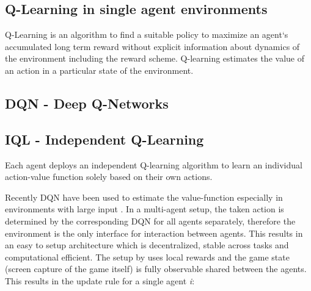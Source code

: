 
\subsection{Q-Learning in single agent environments}

Q-Learning is an algorithm to find a suitable policy to maximize an agent`s accumulated long term reward without explicit information about dynamics of the environment including the reward scheme. Q-learning estimates the value of an action in a particular state of the environment.\cite{watkins1989learning}



\subsection{DQN - Deep Q-Networks}
\cite{lin1993reinforcement}

\subsection{IQL - Independent Q-Learning}

Each agent deploys an independent Q-learning algorithm to learn an individual action-value function solely based on their own actions.

Recently DQN have been used to estimate the value-function especially in environments with large input \cite{tampuu2017multiagent}. In a multi-agent setup, the taken action is determined by the corresponding DQN for all agents separately, therefore the environment is the only interface for interaction between agents. This results in an easy to setup architecture which is decentralized, stable across tasks and computational efficient. The setup by \cite{tampuu2017multiagent} uses local rewards and the game state (screen capture of the game itself) is fully observable shared between the agents.
This results in the update rule for a single agent \textit{i}:

